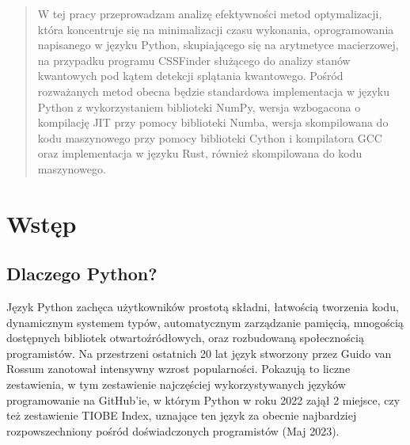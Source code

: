 \documentclass[10pt, a4paper]{article}
\begin{document}
  \begin{sloppypar}
    \begin{abstract}
      W tej pracy przeprowadzam analizę efektywności metod optymalizacji, która
      koncentruje się na minimalizacji czasu wykonania, oprogramowania napisanego w języku
      Python\cite{Python_Language}\cite{ML_Learning_Python}, skupiającego się na
      arytmetyce macierzowej, na przypadku programu CSSFinder służącego do analizy stanów
      kwantowych pod kątem detekcji splątania kwantowego. Pośród rozważanych metod
      obecna będzie standardowa implementacja w języku Python z wykorzystaniem
      biblioteki NumPy\cite{NumPy_Article}\cite{NumPy_Doc}, wersja wzbogacona o kompilację
      JIT przy pomocy biblioteki Numba\cite{Numba_Article}\cite{Numba_Doc}, wersja
      skompilowana do kodu maszynowego przy pomocy biblioteki Cython\cite{Cython_The_Best_Of_Both}\cite{Cython_Org}
      i kompilatora GCC\cite{GCC_Org} oraz implementacja w języku Rust\cite{Rust_Programming_Language},
      również skompilowana do kodu maszynowego.
    \end{abstract}

    \section{Wstęp}


    \subsection{Dlaczego Python?}


    Język Python zachęca użytkowników prostotą składni, łatwością tworzenia kodu,
    dynamicznym systemem typów, automatycznym zarządzanie pamięcią, mnogością dostępnych
    bibliotek otwartoźródłowych, oraz rozbudowaną społecznością programistów. Na
    przestrzeni ostatnich 20 lat język stworzony przez Guido van Rossum zanotował
    intensywny wzrost popularności. Pokazują to liczne zestawienia, w tym zestawienie
    najczęściej wykorzystywanych języków programowanie na GitHub'ie\cite{GitHub_Top_languages},
    w którym Python w roku 2022 zajął 2 miejsce, czy też zestawienie TIOBE Index\cite{TIOBE_Software_Index},
    uznające ten język za obecnie najbardziej rozpowszechniony pośród doświadczonych programistów
    (Maj 2023).


\end{sloppypar}
\end{document}
